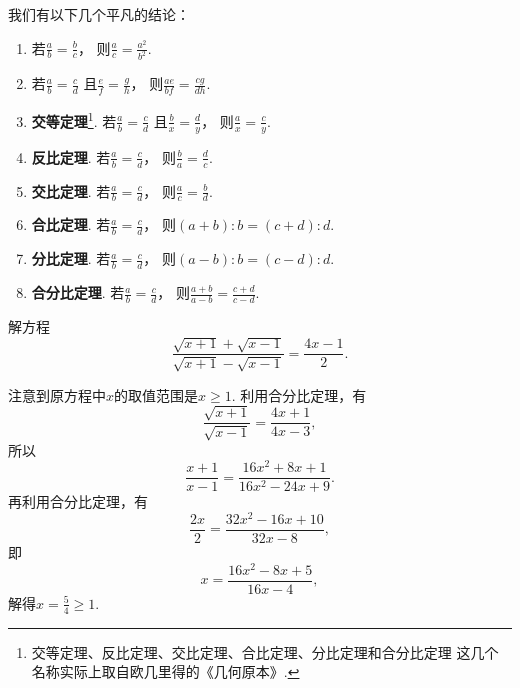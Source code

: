 我们有以下几个平凡的结论：\begin{enumerate}
	\item 若\(\frac{a}{b} = \frac{b}{c}\)，
	则\(\frac{a}{c} = \frac{a^2}{b^2}\).
	\item 若\(\frac{a}{b} = \frac{c}{d}\)
	且\(\frac{e}{f} = \frac{g}{h}\)，
	则\(\frac{ae}{bf} = \frac{cg}{dh}\).
	\item {\rm\bf 交等定理}\footnote{%
	交等定理、反比定理、交比定理、合比定理、分比定理和合分比定理
	这几个名称实际上取自欧几里得的《几何原本》.%
	}.
	若\(\frac{a}{b} = \frac{c}{d}\)
	且\(\frac{b}{x} = \frac{d}{y}\)，
	则\(\frac{a}{x} = \frac{c}{y}\).
	\item {\rm\bf 反比定理}.
	若\(\frac{a}{b} = \frac{c}{d}\)，
	则\(\frac{b}{a} = \frac{d}{c}\).
	\item {\rm\bf 交比定理}.
	若\(\frac{a}{b} = \frac{c}{d}\)，
	则\(\frac{a}{c} = \frac{b}{d}\).
	\item {\rm\bf 合比定理}.
	若\(\frac{a}{b} = \frac{c}{d}\)，
	则\((a+b):b = (c+d):d\).
	\item {\rm\bf 分比定理}.
	若\(\frac{a}{b} = \frac{c}{d}\)，
	则\((a-b):b = (c-d):d\).
	\item {\rm\bf 合分比定理}.
	若\(\frac{a}{b} = \frac{c}{d}\)，
	则\(\frac{a+b}{a-b} = \frac{c+d}{c-d}\).
\end{enumerate}

\begin{example}
解方程\begin{equation*}
	\frac{\sqrt{x+1}+\sqrt{x-1}}{\sqrt{x+1}-\sqrt{x-1}} = \frac{4x-1}{2}.
\end{equation*}
\begin{solution}
注意到原方程中\(x\)的取值范围是\(x\geq1\).
利用合分比定理，有\begin{equation*}
	\frac{\sqrt{x+1}}{\sqrt{x-1}} = \frac{4x+1}{4x-3},
\end{equation*}
所以\begin{equation*}
	\frac{x+1}{x-1} = \frac{16x^2+8x+1}{16x^2-24x+9}.
\end{equation*}
再利用合分比定理，有\begin{equation*}
	\frac{2x}{2} = \frac{32x^2-16x+10}{32x-8},
\end{equation*}
即\begin{equation*}
	x = \frac{16x^2-8x+5}{16x-4},
\end{equation*}
解得\(x=\frac{5}{4} \geq1\).
\end{solution}
\end{example}

